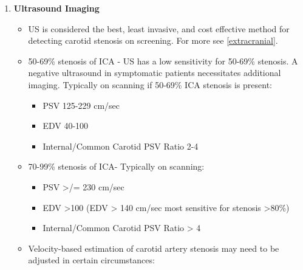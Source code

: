 \documentclass[
]{book}
\providecommand{\tightlist}{%
  \setlength{\itemsep}{0pt}\setlength{\parskip}{0pt}}
\begin{document}
\begin{enumerate}
  \begin{itemize}
  \item
    Evidence of clinically significant peripheral vascular disease
    regardless of age
  \item
    Patients aged \textgreater65 years with a history of one or more of the
    following atherosclerotic risk factors:

    \begin{itemize}
    \item
      CAD
    \item
      Smoking
    \item
      Hypercholesterolemia
    \end{itemize}
  \end{itemize}

  In general, the more risk factors present, the higher the yield of
  screening for the patient. Presence of a carotid bruit, AAA or
  family history of disease alone is not sufficient to warrant
  imaging.\citep{aburahma2022}
\item
  \textbf{Ultrasound Imaging}

  \begin{itemize}
  \item
    US is considered the best, least invasive, and cost effective
    method for detecting carotid stenosis on
    screening.\citep{shaalan2008} For more see \ref{extracranial}.
  \item
    50-69\% stenosis of ICA - US has a low sensitivity for 50-69\%
    stenosis. A negative ultrasound in symptomatic patients
    necessitates additional imaging. Typically on scanning if 50-69\%
    ICA stenosis is present:

    \begin{itemize}
    \tightlist
    \item
      PSV 125-229 cm/sec
    \item
      EDV 40-100
    \item
      Internal/Common Carotid PSV Ratio 2-4
    \end{itemize}
  \item
    70-99\% stenosis of ICA- Typically on scanning:

    \begin{itemize}
    \item
      PSV \textgreater/= 230 cm/sec
    \item
      EDV \textgreater100 (EDV \textgreater{} 140 cm/sec most sensitive for stenosis
      \textgreater80\%)
    \item
      Internal/Common Carotid PSV Ratio \textgreater{} 4
    \end{itemize}
  \item
    Velocity-based estimation of carotid artery stenosis may need to
    be adjusted in certain circumstances:


\end{itemize}
\end{enumerate}
\end{document}
